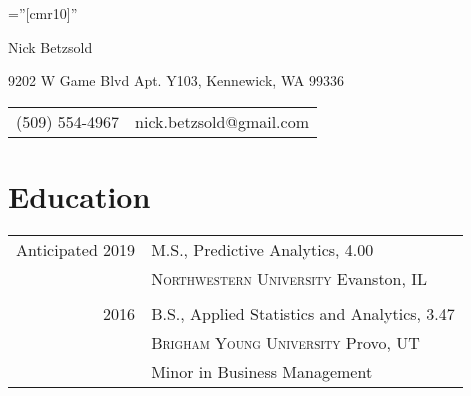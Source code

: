 \documentclass[a4paper,12pt]{article}
\begin{document}

\pagestyle{empty} %

\font\fb=''[cmr10]'' %

\par{\centering
		{\Huge Nick Betzsold
	}\par}

\par{\centering
    {9202 W Game Blvd Apt. Y103, Kennewick, WA 99336 \\
     \begin{tabular}{rl}
     (509) 554-4967 & nick.betzsold@gmail.com
     \end{tabular}
    }\par}

\section{Education}
\begin{tabular}{rp{11cm}}	
  Anticipated 2019 & M.S., Predictive Analytics, 4.00 \\
  & \textsc{Northwestern University} Evanston, IL \\ \\
  
  2016 & B.S., Applied Statistics and Analytics, 3.47 \\
  & \textsc{Brigham Young University} Provo, UT \\
  & Minor in Business Management \\
\end{tabular}


\end{document}
